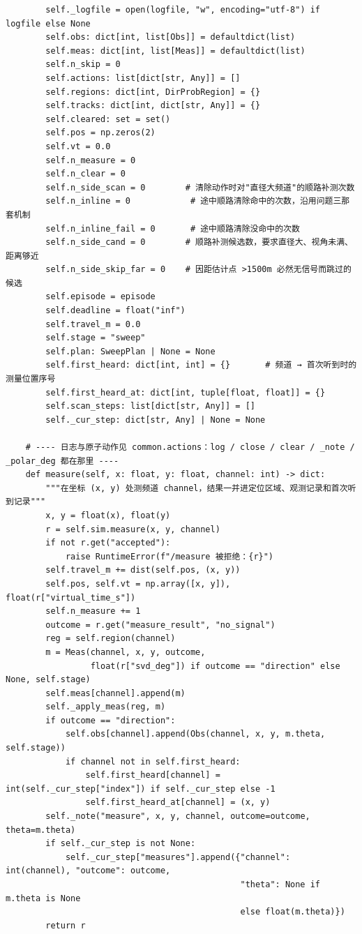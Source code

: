 \documentclass[UTF8, zihao=5,AutoFakeBold=2]{ctexart}
\begin{document}
\begin{lstlisting}
        self._logfile = open(logfile, "w", encoding="utf-8") if logfile else None
        self.obs: dict[int, list[Obs]] = defaultdict(list)
        self.meas: dict[int, list[Meas]] = defaultdict(list)
        self.n_skip = 0
        self.actions: list[dict[str, Any]] = []
        self.regions: dict[int, DirProbRegion] = {}
        self.tracks: dict[int, dict[str, Any]] = {}
        self.cleared: set = set()
        self.pos = np.zeros(2)
        self.vt = 0.0
        self.n_measure = 0
        self.n_clear = 0
        self.n_side_scan = 0        # 清除动作时对"直径大频道"的顺路补测次数
        self.n_inline = 0            # 途中顺路清除命中的次数，沿用问题三那套机制
        self.n_inline_fail = 0       # 途中顺路清除没命中的次数
        self.n_side_cand = 0        # 顺路补测候选数，要求直径大、视角未满、距离够近
        self.n_side_skip_far = 0    # 因距估计点 >1500m 必然无信号而跳过的候选
        self.episode = episode
        self.deadline = float("inf")
        self.travel_m = 0.0
        self.stage = "sweep"
        self.plan: SweepPlan | None = None
        self.first_heard: dict[int, int] = {}       # 频道 → 首次听到时的测量位置序号
        self.first_heard_at: dict[int, tuple[float, float]] = {}
        self.scan_steps: list[dict[str, Any]] = []
        self._cur_step: dict[str, Any] | None = None

    # ---- 日志与原子动作见 common.actions：log / close / clear / _note / _polar_deg 都在那里 ----
    def measure(self, x: float, y: float, channel: int) -> dict:
        """在坐标 (x, y) 处测频道 channel，结果一并进定位区域、观测记录和首次听到记录"""
        x, y = float(x), float(y)
        r = self.sim.measure(x, y, channel)
        if not r.get("accepted"):
            raise RuntimeError(f"/measure 被拒绝：{r}")
        self.travel_m += dist(self.pos, (x, y))
        self.pos, self.vt = np.array([x, y]), float(r["virtual_time_s"])
        self.n_measure += 1
        outcome = r.get("measure_result", "no_signal")
        reg = self.region(channel)
        m = Meas(channel, x, y, outcome,
                 float(r["svd_deg"]) if outcome == "direction" else None, self.stage)
        self.meas[channel].append(m)
        self._apply_meas(reg, m)
        if outcome == "direction":
            self.obs[channel].append(Obs(channel, x, y, m.theta, self.stage))
            if channel not in self.first_heard:
                self.first_heard[channel] = int(self._cur_step["index"]) if self._cur_step else -1
                self.first_heard_at[channel] = (x, y)
        self._note("measure", x, y, channel, outcome=outcome, theta=m.theta)
        if self._cur_step is not None:
            self._cur_step["measures"].append({"channel": int(channel), "outcome": outcome,
                                               "theta": None if m.theta is None
                                               else float(m.theta)})
        return r


\end{lstlisting}
\end{document}
